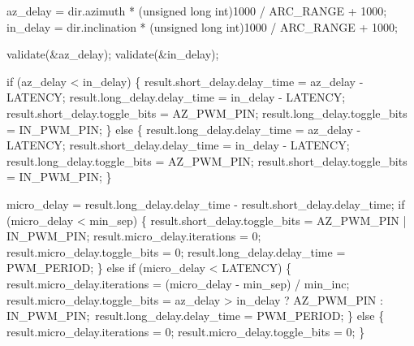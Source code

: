 \documentclass[]{article}
\begin{document}
	az\_delay = dir.azimuth * (unsigned long int)1000 / ARC\_RANGE + 1000;\newline
	in\_delay = dir.inclination * (unsigned long int)1000 / ARC\_RANGE + 1000;\newline
	
	validate(\&az\_delay);\newline
	validate(\&in\_delay);\newline
	
	if (az\_delay < in\_delay)\newline
	\{\newline
		result.short\_delay.delay\_time = az\_delay - LATENCY;\newline
		result.long\_delay.delay\_time = in\_delay - LATENCY;\newline
		result.short\_delay.toggle\_bits = AZ\_PWM\_PIN;\newline
		result.long\_delay.toggle\_bits = IN\_PWM\_PIN;\newline
	\}\newline
	else\newline
	\{\newline
		result.long\_delay.delay\_time = az\_delay - LATENCY;\newline
		result.short\_delay.delay\_time = in\_delay - LATENCY;\newline
		result.long\_delay.toggle\_bits = AZ\_PWM\_PIN;\newline
		result.short\_delay.toggle\_bits = IN\_PWM\_PIN;\newline
	\}\newline
	
	micro\_delay = result.long\_delay.delay\_time - result.short\_delay.delay\_time;\newline
	if (micro\_delay < min\_sep)\newline
	\{\newline
		result.short\_delay.toggle\_bits = AZ\_PWM\_PIN | IN\_PWM\_PIN;\newline
		result.micro\_delay.iterations = 0;\newline
		result.micro\_delay.toggle\_bits = 0;\newline
		result.long\_delay.delay\_time = PWM\_PERIOD;\newline
	\}\newline
	else if (micro\_delay < LATENCY)\newline
	\{\newline
		result.micro\_delay.iterations = (micro\_delay - min\_sep) / min\_inc;\newline
		result.micro\_delay.toggle\_bits = az\_delay > in\_delay ? AZ\_PWM\_PIN : IN\_PWM\_PIN;\newline\
		result.long\_delay.delay\_time = PWM\_PERIOD;\newline
	\}\newline
	else\newline
	\{\newline
		result.micro\_delay.iterations = 0;\newline
		result.micro\_delay.toggle\_bits = 0;\newline
	\}\newline
	
\end{document}
